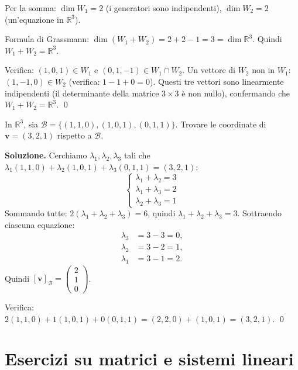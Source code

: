 Per la somma: $\dim W_1 = 2$ (i generatori sono indipendenti), $\dim W_2 = 2$ (un'equazione in $\mathbb{R}^3$).

Formula di Grassmann: $\dim(W_1 + W_2) = 2 + 2 - 1 = 3 = \dim \mathbb{R}^3$. Quindi $W_1 + W_2 = \mathbb{R}^3$.

Verifica: $(1,0,1) \in W_1$ e $(0,1,-1) \in W_1 \cap W_2$. Un vettore di $W_2$ non in $W_1$: $(1, -1, 0) \in W_2$ (verifica: $1-1+0=0$). Questi tre vettori sono linearmente indipendenti (il determinante della matrice $3\times 3$ è non nullo), confermando che $W_1 + W_2 = \mathbb{R}^3$. \qed

\medskip

\begin{examplebox}
In $\mathbb{R}^3$, sia $\mathcal{B} = \{(1,1,0), (1,0,1), (0,1,1)\}$. Trovare le coordinate di $\mathbf{v} = (3, 2, 1)$ rispetto a $\mathcal{B}$.
\end{examplebox}

\textbf{Soluzione.} Cerchiamo $\lambda_1, \lambda_2, \lambda_3$ tali che $\lambda_1(1,1,0) + \lambda_2(1,0,1) + \lambda_3(0,1,1) = (3,2,1)$:
\[
\begin{cases}
\lambda_1 + \lambda_2 = 3 \\
\lambda_1 + \lambda_3 = 2 \\
\lambda_2 + \lambda_3 = 1
\end{cases}
\]
Sommando tutte: $2(\lambda_1 + \lambda_2 + \lambda_3) = 6$, quindi $\lambda_1 + \lambda_2 + \lambda_3 = 3$. Sottraendo ciascuna equazione:
\begin{align*}
    \lambda_3 &= 3 - 3 = 0, \\
    \lambda_2 &= 3 - 2 = 1, \\
    \lambda_1 &= 3 - 1 = 2.
\end{align*}
Quindi $[\mathbf{v}]_{\mathcal{B}} = \begin{pmatrix} 2 \\ 1 \\ 0 \end{pmatrix}$.

Verifica: $2(1,1,0) + 1(1,0,1) + 0(0,1,1) = (2,2,0) + (1,0,1) = (3,2,1)$. \checkmark \qed

\section[Matrici e sistemi]{Esercizi su matrici e sistemi lineari}
\label{sec:es-matrici}

